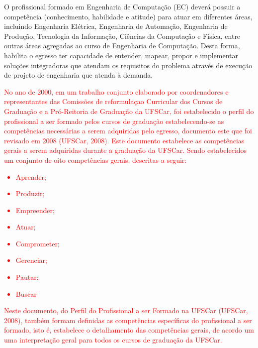 
O profissional formado em Engenharia de Computação (EC) deverá possuir a competência (conhecimento, habilidade e atitude) para atuar em diferentes áreas, incluindo Engenharia Elétrica, Engenharia de Automação, Engenharia de Produção, Tecnologia da Informação, Ciências da Computação e Física, entre outras áreas agregadas ao curso de Engenharia de Computação. Desta forma, habilita o egresso ter capacidade de entender, mapear, propor e implementar soluções integradoras que atendam os requisitos do problema através de execução de projeto de engenharia que atenda à demanda.



\textcolor{red}{No ano de 2000, em um trabalho conjunto elaborado por coordenadores e 
representantes das Comissões de reformulaçao
 Curricular dos Cursos de Graduação e a
Pró-Reitoria de Graduação da UFSCar, foi estabelecido o perfil do profissional a ser formado pelos cursos de graduação estabelecendo-se as competências necessárias a serem adquiridas pelo egresso, documento este que foi revisado em 2008 (UFSCar, 2008). Este documento estabelece as competências gerais a serem adquiridas durante a graduação da UFSCar. Sendo estabelecidos um conjunto de oito competências gerais, descritas a seguir:}
\textcolor{red}{\begin{itemize}
    \item Aprender;
    \item Produzir;
    \item Empreender;
    \item Atuar;
    \item Comprometer;
    \item Gerenciar;
    \item Pautar;
    \item Buscar
\end{itemize}}

\textcolor{red}{Neste documento, do Perfil do Profissional a ser Formado na UFSCar (UFSCar, 2008), também formam definidas as competências específicas do profissional a ser formado, isto é, estabelece o detalhamento das competências gerais, de acordo um uma interpretação geral para todos os cursos de graduação da UFSCar.}

